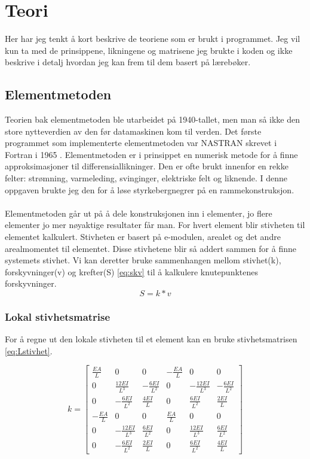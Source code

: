 \documentclass[10pt,a4paper, norsk]{article}
\begin{document}
\section{Teori}

Her har jeg tenkt å kort beskrive de teoriene som er brukt i programmet. Jeg vil kun ta med de prinsippene, likningene og matrisene jeg brukte i koden og ikke beskrive i detalj hvordan jeg kan frem til dem basert på lærebøker. 


\subsection{Elementmetoden}
Teorien bak elementmetoden ble utarbeidet på 1940-tallet, men man så ikke den store nytteverdien av den før datamaskinen kom til verden. Det første programmet som implementerte elementmetoden var NASTRAN skrevet i Fortran i 1965 \cite{wikinastran}.
Elementmetoden er i prinsippet en numerisk metode for å finne approksimasjoner til differensiallikninger. Den er ofte brukt innenfor en rekke felter: strømning, varmeleding, svinginger, elektriske felt og liknende. I denne oppgaven brukte jeg den for å løse styrkebergnegrer på en rammekonstruksjon. 

\paragraph{}
Elementmetoden går ut på å dele konstruksjonen inn i elementer, jo flere elementer jo mer nøyaktige resultater får man. For hvert element blir stivheten til elementet kalkulert. Stivheten er basert på e-modulen, arealet og det andre arealmomentet til elementet. Disse stivhetene blir så addert sammen for å finne systemets stivhet. Vi kan deretter bruke sammenhangen mellom stivhet(k), forskyvninger(v) og krefter(S) \eqref{eq:skv} til å kalkulere knutepunktenes forskyvninger.
\begin{equation} \label{eq:skv}
S=k*v
\end{equation}

\subsubsection{Lokal stivhetsmatrise}
For å regne ut den lokale stivheten til et element kan en bruke stivhetsmatrisen \eqref{eq:Lstivhet}. 

\begin{equation} \label{eq:Lstivhet}
k  = \begin{bmatrix} 
\frac{EA}{L} & 0 & 0 & -\frac{EA}{L} & 0 & 0 \\
0 	& \frac{12EI}{L^3} & -\frac{6EI}{L^2} & 0 & -\frac{12EI}{L^3} & -\frac{6EI}{L^2} \\
0 	&	-\frac{6EI}{L^2} 	& 	\frac{4EI}{L} & 0 & \frac{6EI}{L^2} 	& 	\frac{2EI}{L}\\
-\frac{EA}{L} & 0 & 0 & \frac{EA}{L} & 0 & 0 \\
0 	& -\frac{12EI}{L^3} & \frac{6EI}{L^2} & 0 & \frac{12EI}{L^3} & \frac{6EI}{L^2} \\
0 & -\frac{6EI}{L^2} & \frac{2EI}{L} &0& \frac{6EI}{L^2} & \frac{4EI}{L}
\end{bmatrix}
\end{equation}
\end{document}
